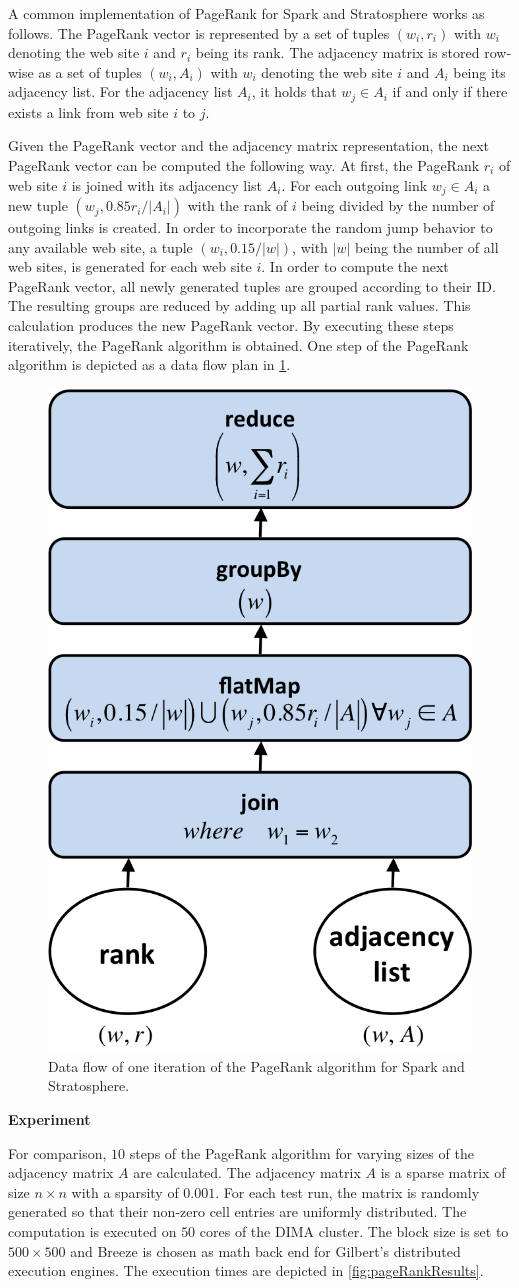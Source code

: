 A common implementation of PageRank for Spark and Stratosphere works as follows.
The PageRank vector is represented by a set of tuples $(w_i, r_i)$ with $w_i$ denoting the web site $i$ and $r_i$ being its rank.
The adjacency matrix is stored row-wise as a set of tuples $(w_i, A_i)$ with $w_i$ denoting the web site $i$ and $A_i$ being its adjacency list.
For the adjacency list $A_i$, it holds that $w_j \in A_i$ if and only if there exists a link from web site $i$ to $j$.

Given the PageRank vector and the adjacency matrix representation, the next PageRank vector can be computed the following way.
At first, the PageRank $r_i$ of web site $i$ is joined with its adjacency list $A_i$.
For each outgoing link $w_j \in A_i$ a new tuple $(w_j, 0.85r_i/\left|A_i\right|)$ with the rank of $i$ being divided by the number of outgoing links is created.
In order to incorporate the random jump behavior to any available web site, a tuple $(w_i, 0.15/|w|)$, with $|w|$ being the number of all web sites, is generated for each web site $i$.
In order to compute the next PageRank vector, all newly generated tuples are grouped according to their ID.
The resulting groups are reduced by adding up all partial rank values.
This calculation produces the new PageRank vector.
By executing these steps iteratively, the PageRank algorithm is obtained.
One step of the PageRank algorithm is depicted as a data flow plan in \cref{fig:pageRankDataFlow}.

\begin{figure}[!h]
	\centering
	\includegraphics[width=.3\linewidth]{images/pageRankStep.png}
	\caption{Data flow of one iteration of the PageRank algorithm for Spark and Stratosphere.}
	\label{fig:pageRankDataFlow}
\end{figure}

\textbf{Experiment}

For comparison, $10$ steps of the PageRank algorithm for varying sizes of the adjacency matrix $A$ are calculated.
The adjacency matrix $A$ is a sparse matrix of size $n \times n$ with a sparsity of $0.001$.
For each test run, the matrix is randomly generated so that their non-zero cell entries are uniformly distributed.
The computation is executed on $50$ cores of the DIMA cluster.
The block size is set to $500 \times 500$ and Breeze is chosen as math back end for Gilbert's distributed execution engines.
The execution times are depicted in \cref{fig:pageRankResults}.

